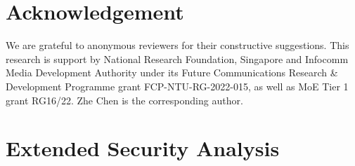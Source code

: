 \documentclass[conference,compsoc]{IEEEtran}
\begin{document}
\section*{Acknowledgement}
%
We are grateful to anonymous reviewers for their constructive suggestions. 
This research is support by National Research Foundation, Singapore and Infocomm Media Development Authority under its Future Communications Research \& Development Programme grant FCP-NTU-RG-2022-015, as well as MoE Tier 1 grant RG16/22. Zhe Chen is the corresponding author.


\balance
 



\newpage
\appendices


\section{Extended Security Analysis} \label{apx:entropy}
%
\end{document}
